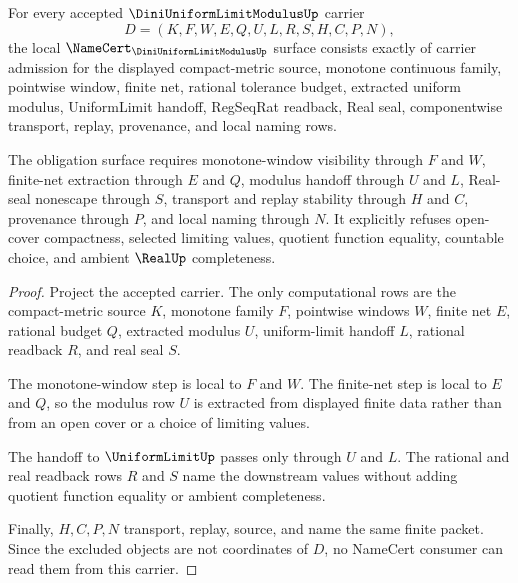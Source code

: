 \begin{theorem}
\label{thm:dini-uniform-limit-modulus-namecert-obligations}
For every accepted $\DiniUniformLimitModulusUp$ carrier
$$
D=(K,F,W,E,Q,U,L,R,S,H,C,P,N),
$$
the local $\NameCert_{\DiniUniformLimitModulusUp}$ surface consists exactly of carrier admission for the displayed compact-metric source, monotone continuous family, pointwise window, finite net, rational tolerance budget, extracted uniform modulus, UniformLimit handoff, RegSeqRat readback, Real seal, componentwise transport, replay, provenance, and local naming rows.

The obligation surface requires monotone-window visibility through $F$ and $W$, finite-net extraction through $E$ and $Q$, modulus handoff through $U$ and $L$, Real-seal nonescape through $S$, transport and replay stability through $H$ and $C$, provenance through $P$, and local naming through $N$. It explicitly refuses open-cover compactness, selected limiting values, quotient function equality, countable choice, and ambient $\RealUp$ completeness.
\end{theorem}
\begin{proof}
Project the accepted carrier. The only computational rows are the compact-metric source $K$, monotone family $F$, pointwise windows $W$, finite net $E$, rational budget $Q$, extracted modulus $U$, uniform-limit handoff $L$, rational readback $R$, and real seal $S$.

The monotone-window step is local to $F$ and $W$. The finite-net step is local to $E$ and $Q$, so the modulus row $U$ is extracted from displayed finite data rather than from an open cover or a choice of limiting values.

The handoff to $\UniformLimitUp$ passes only through $U$ and $L$. The rational and real readback rows $R$ and $S$ name the downstream values without adding quotient function equality or ambient completeness.

Finally, $H,C,P,N$ transport, replay, source, and name the same finite packet. Since the excluded objects are not coordinates of $D$, no NameCert consumer can read them from this carrier.
\end{proof}


